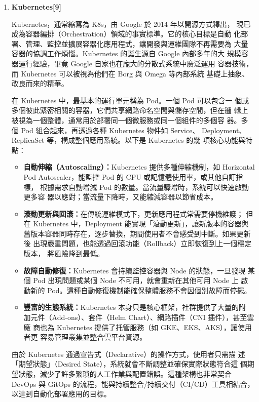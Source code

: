 \documentclass[12pt,a4paper]{article}
\begin{document}
\begin{enumerate}[label={(\zhdig*)}, leftmargin=2\parindent, listparindent=\parindent]
\begin{enumerate}[label={(\arabic*)}, leftmargin=\parindent, listparindent=\parindent]
\item\textbf{
Kubernetes[9]
}

Kubernetes，通常縮寫為 K8s，由 Google 於 2014 年以開源方式釋出，
現已成為容器編排（Orchestration）領域的事實標準。它的核心目標是自動
化部署、管理、監控並擴展容器化應用程式，讓開發與運維團隊不再需要為
大量容器的協調工作煩惱。Kubernetes 的誕生源自 Google 內部多年的大
規模容器運行經驗，畢竟 Google 自家也在龐大的分散式系統中廣泛運用
容器技術，而 Kubernetes 可以被視為他們在 Borg 與 Omega 等內部系統
基礎上抽象、改良而來的精華。

在 Kubernetes 中，最基本的運行單元稱為 Pod。一個 Pod 可以包含一
個或多個彼此緊密相關的容器，它們共享網路命名空間與儲存空間，但在邏
輯上被視為一個整體，通常用於部署同一個微服務或同一個組件的多個容
器。多個 Pod 組合起來，再透過各種 Kubernetes 物件如 Service、
Deployment、ReplicaSet 等，構成整個應用系統。以下是 Kubernetes 的幾
項核心功能與特點：

\begin{itemize}[leftmargin=\parindent, listparindent=\parindent]
\item\textbf{
自動伸縮（Autoscaling）：}Kubernetes 提供多種伸縮機制，如 Horizontal
Pod Autoscaler，能監控 Pod 的 CPU 或記憶體使用率，或其他自訂指標，
根據需求自動增減 Pod 的數量。當流量驟增時，系統可以快速啟動更多容
器以應對；當流量下降時，又能縮減容器以節省成本。

    \item\textbf{
滾動更新與回滾：}在傳統運維模式下，更新應用程式常需要停機維護；
但在 Kubernetes 中，Deployment 能實現「滾動更新」，讓新版本的容器與
舊版本容器同時存在，逐步替換，期間使用者不會感受到中斷。如果更新後
出現嚴重問題，也能透過回滾功能（Rollback）立即恢復到上一個穩定版本，
將風險降到最低。

    \item\textbf{
故障自動修復：}Kubernetes 會持續監控容器與 Node 的狀態，一旦發現
某個 Pod 出現問題或某個 Node 不可用，就會重新在其他可用 Node 上
啟動新的 Pod。這種自動修復機制能確保整體服務不會因個別故障而停擺。

    \item\textbf{
豐富的生態系統：}Kubernetes 本身只是核心框架，社群提供了大量的附
加元件（Add-ons）、套件（Helm Chart）、網路插件（CNI 插件），甚至雲廠
商也為 Kubernetes 提供了托管服務（如 GKE、EKS、AKS），讓使用者更
容易管理叢集並整合雲平台資源。

\end{itemize}

由於 Kubernetes 通過宣告式（Declarative）的操作方式，使用者只需描
述「期望狀態」（Desired State），系統就會不斷調整並確保實際狀態符合這
個期望狀態，減少了許多繁瑣的人工作業與配置錯誤。這種架構也非常契合
DevOps 與 GitOps 的流程，能與持續整合/持續交付（CI/CD）工具相結合，
以達到自動化部署應用的目標。


\end{enumerate}
\end{enumerate}
\end{document}

